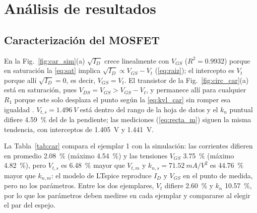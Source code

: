 \documentclass[conference]{IEEEtran}
\newcommand{\kn}{k_n}
\newcommand{\Vts}{V_{t,s}}
\newcommand{\kns}{k_{n,s}}
\newcommand{\Vtm}{V_{t,m}}
\newcommand{\knm}{k_{n,m}}
\begin{document}
\section{Análisis de resultados}

\subsection{Caracterización del MOSFET}
En la Fig.~\ref{fig:car_sim}(a) $\sqrt{I_D}$ crece linealmente con $V_{GS}$ ($R^2=0.9932$) porque en saturación la \eqref{eq:sat} implica $\sqrt{I_D}\propto V_{GS}-V_t$ (\eqref{eq:raiz}); el intercepto es $V_t$ porque allí $\sqrt{I_D}=0$, es decir, $V_{GS}=V_t$. El transistor de la Fig.~\ref{fig:circ_car}(a) está en saturación, pues $V_{DS}=V_{GS}>V_{GS}-V_t$, y permanece allí para cualquier $R_1$ porque este solo desplaza el punto según la \eqref{eq:kvl_car} sin romper esa igualdad \cite{sedra}. $\Vts=\SI{1.496}{V}$ está dentro del rango de la hoja de datos y el $\kn$ puntual difiere \SI{4.59}{\percent} del de la pendiente; las mediciones (\eqref{eq:recta_m}) siguen la misma tendencia, con interceptos de \SI{1.405}{V} y \SI{1.441}{V}.

La Tabla~\ref{tab:car} compara el ejemplar 1 con la simulación: las corrientes difieren en promedio \SI{2.08}{\percent} (máximo \SI{4.54}{\percent}) y las tensiones $V_{GS}$ \SI{3.75}{\percent} (máximo \SI{4.82}{\percent}), pero $\Vts$ es \SI{6.48}{\percent} mayor que $\Vtm$ y $\kns=\SI{71.52}{mA/V^2}$ es \SI{44.76}{\percent} mayor que $\knm$: el modelo de LTspice reproduce $I_D$ y $V_{GS}$ en el punto de medida, pero no los parámetros. Entre los dos ejemplares, $V_t$ difiere \SI{2.60}{\percent} y $\kn$ \SI{10.57}{\percent}, por lo que los parámetros deben medirse en cada ejemplar y compararse al elegir el par del espejo.
\end{document}
